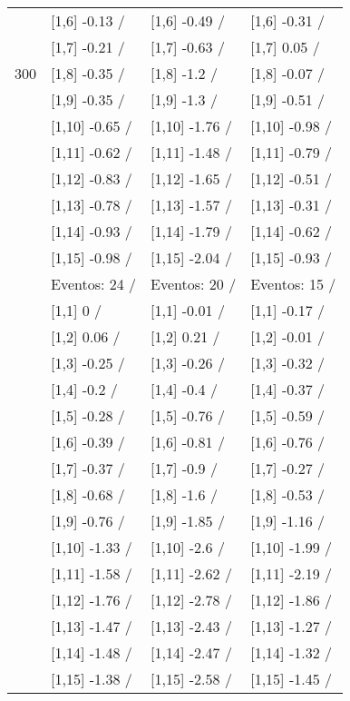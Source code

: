 \begin{table}
\begin{tabular}[t]{llll}
 & {}[1,6] -0.13  / & {}[1,6] -0.49  / & {}[1,6] -0.31  /\\
 & {}[1,7] -0.21  / & {}[1,7] -0.63  / & {}[1,7] 0.05  /\\
300 & {}[1,8] -0.35  / & {}[1,8] -1.2  / & {}[1,8] -0.07  /\\
\addlinespace
 & {}[1,9] -0.35  / & {}[1,9] -1.3  / & {}[1,9] -0.51  /\\
 & {}[1,10] -0.65  / & {}[1,10] -1.76  / & {}[1,10] -0.98  /\\
 & {}[1,11] -0.62  / & {}[1,11] -1.48  / & {}[1,11] -0.79  /\\
 & {}[1,12] -0.83  / & {}[1,12] -1.65  / & {}[1,12] -0.51  /\\
 & {}[1,13] -0.78  / & {}[1,13] -1.57  / & {}[1,13] -0.31  /\\
\addlinespace
 & {}[1,14] -0.93  / & {}[1,14] -1.79  / & {}[1,14] -0.62  /\\
 & {}[1,15] -0.98  / & {}[1,15] -2.04  / & {}[1,15] -0.93  /\\
 & Eventos:  24 / & Eventos:  20 / & Eventos:  15 /\\
 & {}[1,1] 0  / & {}[1,1] -0.01  / & {}[1,1] -0.17  /\\
 & {}[1,2] 0.06  / & {}[1,2] 0.21  / & {}[1,2] -0.01  /\\
\addlinespace
 & {}[1,3] -0.25  / & {}[1,3] -0.26  / & {}[1,3] -0.32  /\\
 & {}[1,4] -0.2  / & {}[1,4] -0.4  / & {}[1,4] -0.37  /\\
 & {}[1,5] -0.28  / & {}[1,5] -0.76  / & {}[1,5] -0.59  /\\
 & {}[1,6] -0.39  / & {}[1,6] -0.81  / & {}[1,6] -0.76  /\\
 & {}[1,7] -0.37  / & {}[1,7] -0.9  / & {}[1,7] -0.27  /\\
\addlinespace
500 & {}[1,8] -0.68  / & {}[1,8] -1.6  / & {}[1,8] -0.53  /\\
 & {}[1,9] -0.76  / & {}[1,9] -1.85  / & {}[1,9] -1.16  /\\
 & {}[1,10] -1.33  / & {}[1,10] -2.6  / & {}[1,10] -1.99  /\\
 & {}[1,11] -1.58  / & {}[1,11] -2.62  / & {}[1,11] -2.19  /\\
 & {}[1,12] -1.76  / & {}[1,12] -2.78  / & {}[1,12] -1.86  /\\
\addlinespace
 & {}[1,13] -1.47  / & {}[1,13] -2.43  / & {}[1,13] -1.27  /\\
 & {}[1,14] -1.48  / & {}[1,14] -2.47  / & {}[1,14] -1.32  /\\
 & {}[1,15] -1.38  / & {}[1,15] -2.58  / & {}[1,15] -1.45  /\\
\bottomrule
\end{tabular}
\end{table}
